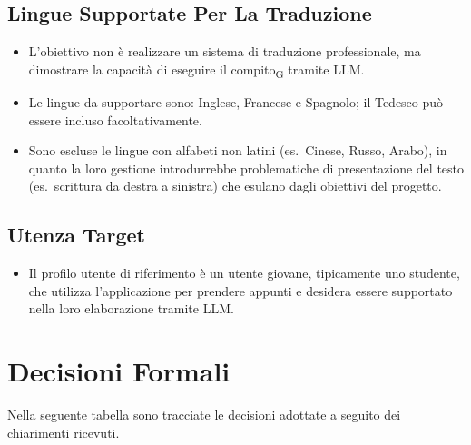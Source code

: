 \subsection{Lingue Supportate Per La Traduzione}
\begin{itemize}
	\item L'obiettivo non è realizzare un sistema di traduzione professionale,
	      ma dimostrare la capacità di eseguire il compito\textsubscript{G} tramite LLM.
	\item Le lingue da supportare sono: Inglese, Francese e Spagnolo; il
	      Tedesco può essere incluso facoltativamente.
	\item Sono escluse le lingue con alfabeti non latini (es.\ Cinese,
	      Russo, Arabo), in quanto la loro gestione introdurrebbe problematiche
	      di presentazione del testo (es.\ scrittura da destra a sinistra)
	      che esulano dagli obiettivi del progetto.
\end{itemize}

\subsection{Utenza Target}
\begin{itemize}
	\item Il profilo utente di riferimento è un utente giovane, tipicamente
	      uno studente, che utilizza l'applicazione per prendere appunti e
	      desidera essere supportato nella loro elaborazione tramite LLM.
\end{itemize}

\section{Decisioni Formali}
Nella seguente tabella sono tracciate le decisioni adottate a seguito
dei chiarimenti ricevuti.

